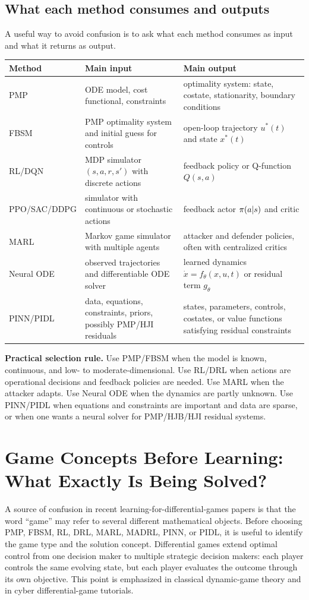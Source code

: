 \documentclass[11pt,a4paper]{article}
\begin{document}
\subsection{What each method consumes and outputs}
A useful way to avoid confusion is to ask what each method consumes as input and what it returns as output.
\begin{longtable}{p{}p{}p{}}
\toprule
Method & Main input & Main output \\
\midrule
PMP & ODE model, cost functional, constraints & optimality system: state, costate, stationarity, boundary conditions \\
FBSM & PMP optimality system and initial guess for controls & open-loop trajectory $u^*(t)$ and state $x^*(t)$ \\
RL/DQN & MDP simulator $(s,a,r,s')$ with discrete actions & feedback policy or Q-function $Q(s,a)$ \\
PPO/SAC/DDPG & simulator with continuous or stochastic actions & feedback actor $\pi(a|s)$ and critic \\
MARL & Markov game simulator with multiple agents & attacker and defender policies, often with centralized critics \\
Neural ODE & observed trajectories and differentiable ODE solver & learned dynamics $\dot{x}=f_\theta(x,u,t)$ or residual term $g_\theta$ \\
PINN/PIDL & data, equations, constraints, priors, possibly PMP/HJI residuals & states, parameters, controls, costates, or value functions satisfying residual constraints \\
\bottomrule
\end{longtable}

\begin{boxednote}
\textbf{Practical selection rule.}
Use PMP/FBSM when the model is known, continuous, and low- to moderate-dimensional. Use RL/DRL when actions are operational decisions and feedback policies are needed. Use MARL when the attacker adapts. Use Neural ODE when the dynamics are partly unknown. Use PINN/PIDL when equations and constraints are important and data are sparse, or when one wants a neural solver for PMP/HJB/HJI residual systems.
\end{boxednote}


\section{Game Concepts Before Learning: What Exactly Is Being Solved?}\label{sec:game-concepts}
A source of confusion in recent learning-for-differential-games papers is that the word ``game'' may refer to several different mathematical objects. Before choosing PMP, FBSM, RL, DRL, MARL, MADRL, PINN, or PIDL, it is useful to identify the game type and the solution concept. Differential games extend optimal control from one decision maker to multiple strategic decision makers: each player controls the same evolving state, but each player evaluates the outcome through its own objective. This point is emphasized in classical dynamic-game theory \cite{isaacs1965,basar1999} and in cyber differential-game tutorials.
\end{document}
